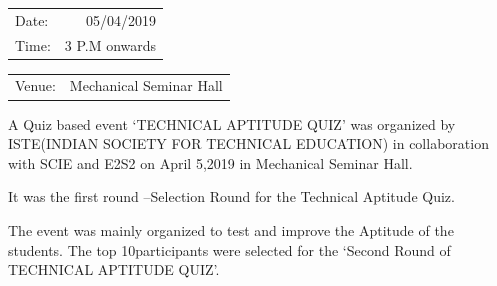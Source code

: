 \documentclass[12pt, a4 paper]{article}
\begin{document}
\begin{center}
\begin{multicols}{2}
\begin{tabular}{l r}
Date: & 05/04/2019\\ %
Time: & 3 P.M onwards \\ %
\end{tabular}
\columnbreak
\begin{tabular}{l r}
Venue: & Mechanical Seminar Hall \\ %
\end{tabular}
\end{multicols}

\begin{Large}
\justify
A Quiz based event ‘TECHNICAL APTITUDE QUIZ’ was organized by ISTE(INDIAN SOCIETY FOR TECHNICAL EDUCATION) in collaboration with SCIE and E2S2 on April 5,2019 in Mechanical Seminar Hall. 



\justify
It was the first round –Selection Round for the Technical Aptitude Quiz.



\justify
The event was mainly organized to test and improve the Aptitude of the students. The top 10participants were selected for the ‘Second Round of TECHNICAL APTITUDE QUIZ’. 
  




\end{Large}
\end{center}
\end{document}
